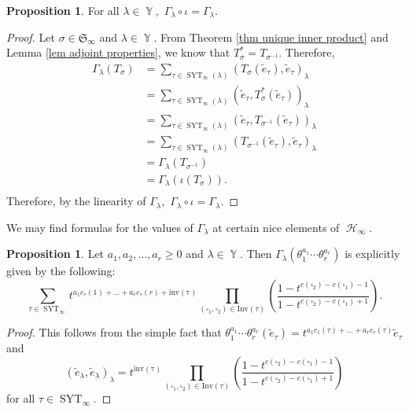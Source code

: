 \documentclass[12pt,reqno]{amsart}
\theoremstyle{definition}
\newtheorem{prop}[thm]{Proposition}
\DeclareMathOperator{\cH}{\mathcal{H}}
\DeclareMathOperator{\SYT}{\mathrm{SYT}}
\DeclareMathOperator{\Par}{\mathbb{Y}}
\begin{document}
\begin{prop}
    For all $\lambda \in \Par,$ $\Gamma_{\lambda}\circ \iota = \Gamma_{\lambda}.$
\end{prop}
\begin{proof}
    Let $\sigma \in \mathfrak{S}_{\infty}$ and $\lambda \in \Par.$ From Theorem \ref{thm unique inner product} and Lemma \ref{lem adjoint properties}, we know that $T_{\sigma}^* = T_{\sigma^{-1}}$. Therefore, 
    \begin{align*}
        \Gamma_{\lambda}(T_{\sigma}) &= \sum_{\tau \in \SYT_{\infty}(\lambda)} (T_{\sigma}(\tilde{e}_{\tau}),\tilde{e}_{\tau})_{\lambda}\\
        &= \sum_{\tau \in \SYT_{\infty}(\lambda)} (\tilde{e}_{\tau},T_{\sigma}^*(\tilde{e}_{\tau}))_{\lambda}\\
        &= \sum_{\tau \in \SYT_{\infty}(\lambda)} (\tilde{e}_{\tau},T_{\sigma^{-1}}(\tilde{e}_{\tau}))_{\lambda}\\
        &= \sum_{\tau \in \SYT_{\infty}(\lambda)} (T_{\sigma^{-1}}(\tilde{e}_{\tau}),\tilde{e}_{\tau})_{\lambda}\\
        &= \Gamma_{\lambda}(T_{\sigma^{-1}})\\
        &= \Gamma_{\lambda}(\iota(T_{\sigma})).\\
    \end{align*}
    Therefore, by the linearity of $\Gamma_{\lambda},$ $\Gamma_{\lambda}\circ \iota = \Gamma_{\lambda}.$
\end{proof}

We may find formulas for the values of $\Gamma_{\lambda}$ at certain nice elements of $\cH_{\infty}.$

\begin{prop}\label{prop gamma values at theta}
    Let $a_1,a_2,\dots, a_r \geq 0$ and $\lambda \in \Par$. Then 
    $\Gamma_{\lambda}(\theta_{1}^{a_1}\cdots \theta_{r}^{a_r})$ is explicitly given by the following:
    $$\sum_{\tau \in \SYT_{\infty}}  t^{a_1c_{\tau}(1)+\dots + a_{r}c_{\tau}(r)+\mathrm{inv(\tau)}}\prod_{(\square_1,\square_2) \in \mathrm{Inv}(\tau)} \left( \frac{1-t^{c(\square_2)-c(\square_1)-1}}{1-t^{c(\square_2)-c(\square_1)+1}} \right).$$
\end{prop}
\begin{proof}
    This follows from the simple fact that $\theta_{1}^{a_1}\cdots \theta_{r}^{a_r}(\tilde{e}_{\tau}) = t^{a_1c_1(\tau)+\dots + a_{r}c_{r}(\tau)}\tilde{e}_{\tau}$ and $$(\tilde{e}_{\lambda},\tilde{e}_{\lambda})_{\lambda} =  t^{\mathrm{inv(\tau)}}\prod_{(\square_1,\square_2) \in \mathrm{Inv}(\tau)} \left( \frac{1-t^{c(\square_2)-c(\square_1)-1}}{1-t^{c(\square_2)-c(\square_1)+1}} \right)$$
    for all $\tau \in \SYT_{\infty}$.
\end{proof}
\end{document}
